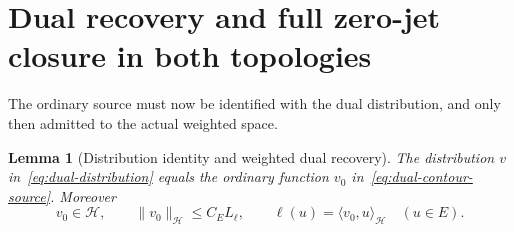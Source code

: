 \documentclass[11pt,a4paper]{article}
\numberwithin{equation}{section}
\newtheorem{lemma}[theorem]{Lemma}
\theoremstyle{definition}
\theoremstyle{remark}
\newcommand{\Hh}{\mathcal H}
\newcommand{\ip}[2]{\langle #1,#2\rangle}
\newcommand{\norm}[1]{\lVert #1\rVert}
\begin{document}
\section{Dual recovery and full zero-jet closure in both topologies}\label{sec:Gamma-jet-core}

The ordinary source must now be identified with the dual distribution, and only then admitted to the actual weighted space.

\begin{lemma}[Distribution identity and weighted dual recovery]\label{lem:dual-recovery}
The distribution $v$ in~\eqref{eq:dual-distribution} equals the ordinary function $v_0$ in~\eqref{eq:dual-contour-source}. Moreover
\begin{equation}\label{eq:dual-H-recovery}
 v_0\in\Hh,\qquad \norm{v_0}_{\Hh}\le C_E L_\ell,\qquad
 \ell(u)=\ip{v_0}{u}_{\Hh}\quad(u\in E).
\end{equation}
\end{lemma}
\end{document}
